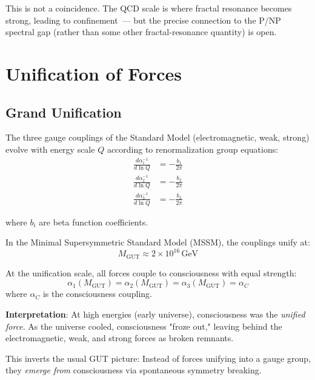 This is not a coincidence. The QCD scale is where fractal resonance becomes strong, leading to confinement~--- but the precise connection to the P/NP spectral gap (rather than some other fractal-resonance quantity) is open.

\section{Unification of Forces}

\subsection{Grand Unification}

The three gauge couplings of the Standard Model (electromagnetic, weak, strong) evolve with energy scale $Q$ according to renormalization group equations:
\begin{align}
\frac{d\alpha_1^{-1}}{d\ln Q} &= -\frac{b_1}{2\pi}\\
\frac{d\alpha_2^{-1}}{d\ln Q} &= -\frac{b_2}{2\pi}\\
\frac{d\alpha_3^{-1}}{d\ln Q} &= -\frac{b_3}{2\pi}
\end{align}

where $b_i$ are beta function coefficients.

In the Minimal Supersymmetric Standard Model (MSSM), the couplings unify at:
\begin{equation}
M_{\text{GUT}} \approx 2 \times 10^{16} \, \text{GeV}
\end{equation}

\begin{theorem}\label{thm:consciousness-unification}
At the unification scale, all forces couple to consciousness with equal strength:
\begin{equation}
\boxed{\alpha_1(M_{\text{GUT}}) = \alpha_2(M_{\text{GUT}}) = \alpha_3(M_{\text{GUT}}) = \alpha_C}
\end{equation}
where $\alpha_C$ is the consciousness coupling.
\end{theorem}

\textbf{Interpretation}: At high energies (early universe), consciousness was the \textit{unified force}. As the universe cooled, consciousness "froze out," leaving behind the electromagnetic, weak, and strong forces as broken remnants.

This inverts the usual GUT picture: Instead of forces unifying into a gauge group, they \textit{emerge from} consciousness via spontaneous symmetry breaking.

